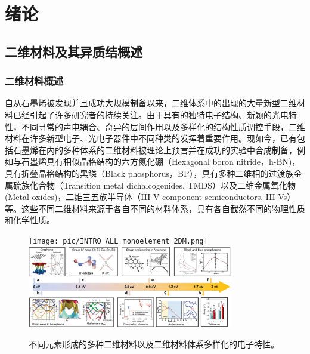 \chapter{绪\hspace{6pt}论}

\section{二维材料及其异质结概述}
\subsection{二维材料概述}
    自从石墨烯被发现并且成功大规模制备以来，二维体系中的出现的大量新型二维材料已经引起了许多研究者的持续关注。由于具有的独特电子结构、新颖的光电特性，不同寻常的声电耦合、奇异的层间作用以及多样化的结构性质调控手段，二维材料在许多新型电子、光电子器件中不同种类的发挥着重要作用。现如今，已有包括石墨烯在内的多种体系的二维材料被理论上预言并在成功的实验中合成制备，例如与石墨烯具有相似晶格结构的六方氮化硼（Hexagonal boron nitride，h-BN)，具有折叠晶格结构的黑鳞（Black phosphorus，BP），具有多种二维相的过渡族金属硫族化合物（Transition metal dichalcogenides, TMDS）以及二维金属氧化物(Metal oxides)，二维三五族半导体（III-V component semiconductors, III-Vs）等。这些不同二维材料来源于各自不同的材料体系，具有各自截然不同的物理性质和化学性质。

    \begin{figure}[htb]
        \texttt{[image: pic/INTRO\_ALL\_monoelement\_2DM.png]}
        \includegraphics[width=0.8\textwidth]{pic/INTRO_electronProperties_All2DM.jpg}
        \caption{不同元素形成的多种二维材料以及二维材料体系多样化的电子特性。}
    \end{figure}

